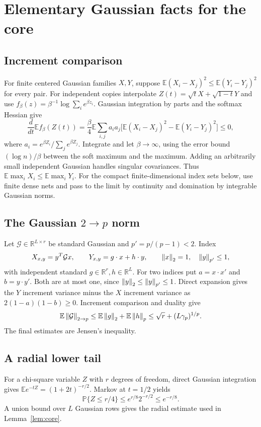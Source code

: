 \documentclass[11pt]{article}
\theoremstyle{remark}\newtheorem{remark}[theorem]{Remark}
\newcommand{\R}{\mathbb R}\newcommand{\E}{\mathbb E}\newcommand{\Prob}{\mathbb P}
\begin{document}
\appendix
\section{Elementary Gaussian facts for the core}\label{app:gauss}
\subsection{Increment comparison}
For finite centered Gaussian families $X,Y$, suppose
$\E(X_i-X_j)^2\le\E(Y_i-Y_j)^2$ for every pair. For independent copies interpolate $Z(t)=\sqrt tX+\sqrt{1-t}Y$ and use
$f_\beta(z)=\beta^{-1}\log\sum_i e^{\beta z_i}$. Gaussian integration by parts and the softmax Hessian give
\[
 \frac d{dt}\E f_\beta(Z(t))
 =\frac\beta4\E\sum_{i,j}a_i a_j
 \big[\E(X_i-X_j)^2-\E(Y_i-Y_j)^2\big]\le0,
\]
where $a_i=e^{\beta Z_i}/\sum_j e^{\beta Z_j}$. Integrate and let $\beta\to\infty$, using the error bound $(\log n)/\beta$ between the soft maximum and the maximum. Adding an arbitrarily small independent Gaussian handles singular covariances. Thus $\E\max_i X_i\le\E\max_iY_i$. For the compact finite-dimensional index sets below, use finite dense nets and pass to the limit by continuity and domination by integrable Gaussian norms.

\subsection{The Gaussian $2\to p$ norm}
Let $\mathcal G\in\R^{L\times r}$ be standard Gaussian and $p'=p/(p-1)<2$. Index
\[
 X_{x,y}=y^T\mathcal Gx,\qquad Y_{x,y}=g\cdot x+h\cdot y,
 \qquad \left\|x\right\|_2=1,\quad\left\|y\right\|_{p'}\le1,
\]
with independent standard $g\in\R^r,h\in\R^L$. For two indices put $a=x\cdot x'$ and $b=y\cdot y'$. Both are at most one, since $\left\|y\right\|_2\le\left\|y\right\|_{p'}\le1$. Direct expansion gives the $Y$ increment variance minus the $X$ increment variance as $2(1-a)(1-b)\ge0$. Increment comparison and duality give
\[
 \E\norm{\mathcal G}_{2\to p}
 \le\E\norm g_2+\E\norm h_p
 \le\sqrt r+(L\gamma_p)^{1/p}.
\]
The final estimates are Jensen's inequality.

\subsection{A radial lower tail}
For a chi-square variable $Z$ with $r$ degrees of freedom, direct Gaussian integration gives
$\E e^{-tZ}=(1+2t)^{-r/2}$. Markov at $t=1/2$ yields
\[
 \Prob\{Z\le r/4\}\le e^{r/8}2^{-r/2}\le e^{-r/8}.
\]
A union bound over $L$ Gaussian rows gives the radial estimate used in Lemma~\ref{lem:core}.
\end{document}

